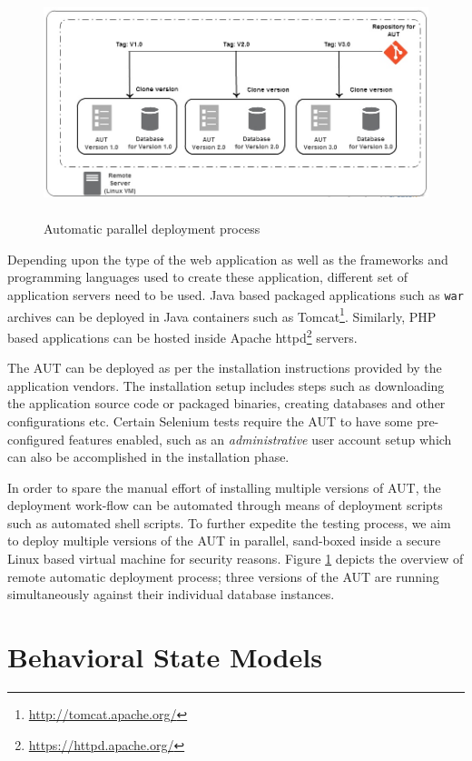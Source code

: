 \begin{figure}[h]
\makeatletter 
\makeatother
    \centering
  \includegraphics[width=5.4in,height=2.6in]{./Figures/Deployment_Process_2.jpg}
  \caption{Automatic parallel deployment process}
  \label{fig:deployment} 
\end{figure}

Depending upon the type of the web application as well as the frameworks and programming languages used to create these application, different set of application servers need to be used. Java based packaged applications such as \texttt{war} archives can be deployed in Java containers such as Tomcat\footnote{\url{http://tomcat.apache.org/}}. Similarly, PHP based applications can be hosted inside Apache httpd\footnote{\url{https://httpd.apache.org/}} servers. 

The AUT can be deployed as per the installation instructions provided by the application vendors. The installation setup includes steps such as downloading the application source code or packaged binaries, creating databases and other configurations etc. Certain Selenium tests require the AUT to have some pre-configured features enabled, such as an \textit{administrative} user account setup which can also be accomplished in the installation phase. 

In order to spare the manual effort of installing multiple versions of AUT, the deployment work-flow can be automated through means of deployment scripts such as automated shell scripts. To further expedite the testing process, we aim to deploy multiple versions of the AUT in parallel, sand-boxed inside a secure Linux based virtual machine for security reasons. Figure \ref{fig:deployment} depicts the overview of remote automatic deployment process; three versions of the AUT are running simultaneously against their individual database instances.

\section{Behavioral State Models}
\label{stateModelExtraction}
